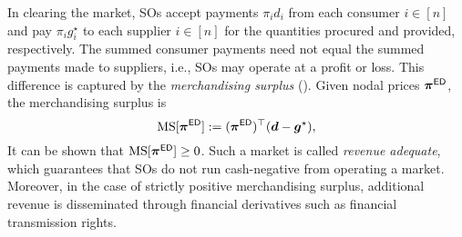In clearing the market, SOs accept payments $\pi_i d_i$ from each consumer $i\in[n]$ and pay $\pi_ig^{\star}_i$ to each supplier $i\in[n]$ for the quantities procured and provided, respectively. 
The summed consumer payments need not equal the summed payments made to suppliers, i.e., SOs may operate at a profit or loss. This difference is captured by the \emph{merchandising surplus} (\MS{}). 
Given nodal prices ${\bm{\pi}}^{{\sf ED}}$, the merchandising surplus is 
\begin{equation}\label{eq:MS}
    {\rm MS}{}[{\bm{\pi}}^{{\sf ED}}] := ({\bm{\pi}}^{{\sf ED}})^\top ({\bm{d}} - {\bm{g}}^\star),
\end{equation}
It can be shown that ${\rm MS}{}[{\bm{\pi}}^{{\sf ED}}] \ge 0$. 
Such a market is called \emph{revenue adequate}, which guarantees that SOs do not run cash-negative from operating a market. Moreover, in the case of strictly positive merchandising surplus, additional revenue is disseminated through financial derivatives such as financial transmission rights. 

